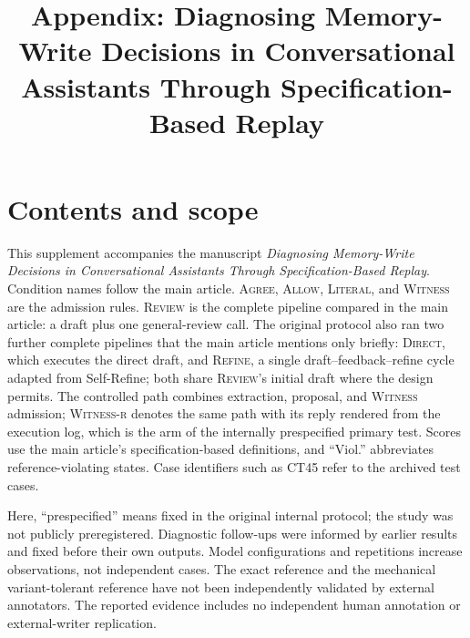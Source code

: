 \documentclass[acmsmall,review]{acmart}
\title[Diagnosing Memory-Write Decisions]{Appendix: Diagnosing Memory-Write Decisions in Conversational Assistants Through Specification-Based Replay}
\newcommand{\agree}{\textsc{Agree}}
\newcommand{\allow}{\textsc{Allow}}
\newcommand{\literal}{\textsc{Literal}}
\newcommand{\witness}{\textsc{Witness}}
\newcommand{\witnessr}{\textsc{Witness-r}}
\newcommand{\review}{\textsc{Review}}
\newcommand{\direct}{\textsc{Direct}}
\newcommand{\refine}{\textsc{Refine}}
\newcommand{\reviewfooter}{\fancyfoot{}\fancyfoot[C]{\footnotesize\thepage}}
\begin{document}
\maketitle\reviewfooter
\section*{Contents and scope}
This supplement accompanies the manuscript \emph{Diagnosing Memory-Write Decisions in Conversational Assistants Through Specification-Based Replay}. Condition names follow the main article. \agree{}, \allow{}, \literal{}, and \witness{} are the admission rules. \review{} is the complete pipeline compared in the main article: a draft plus one general-review call. The original protocol also ran two further complete pipelines that the main article mentions only briefly: \direct{}, which executes the direct draft, and \refine{}, a single draft--feedback--refine cycle adapted from Self-Refine; both share \review{}'s initial draft where the design permits. The controlled path combines extraction, proposal, and \witness{} admission; \witnessr{} denotes the same path with its reply rendered from the execution log, which is the arm of the internally prespecified primary test. Scores use the main article's specification-based definitions, and ``Viol.'' abbreviates reference-violating states. Case identifiers such as CT45 refer to the archived test cases.

Here, ``prespecified'' means fixed in the original internal protocol; the study was not publicly preregistered. Diagnostic follow-ups were informed by earlier results and fixed before their own outputs. Model configurations and repetitions increase observations, not independent cases. The exact reference and the mechanical variant-tolerant reference have not been independently validated by external annotators. The reported evidence includes no independent human annotation or external-writer replication.
\end{document}

